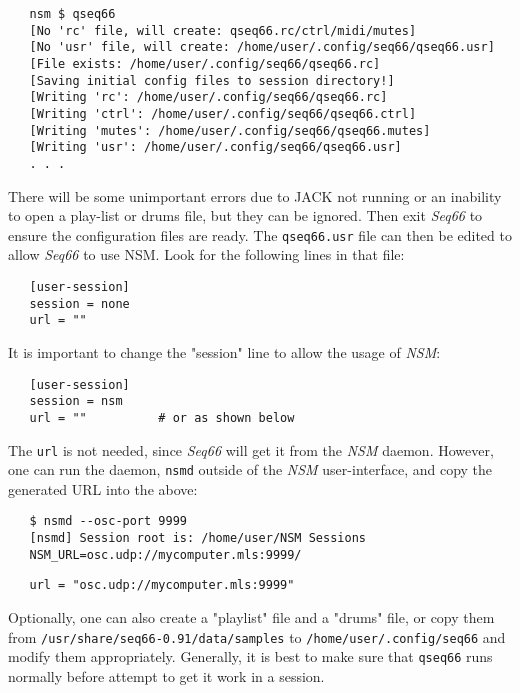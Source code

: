 \begin{verbatim}
   nsm $ qseq66 
   [No 'rc' file, will create: qseq66.rc/ctrl/midi/mutes]
   [No 'usr' file, will create: /home/user/.config/seq66/qseq66.usr]
   [File exists: /home/user/.config/seq66/qseq66.rc]
   [Saving initial config files to session directory!]
   [Writing 'rc': /home/user/.config/seq66/qseq66.rc]
   [Writing 'ctrl': /home/user/.config/seq66/qseq66.ctrl]
   [Writing 'mutes': /home/user/.config/seq66/qseq66.mutes]
   [Writing 'usr': /home/user/.config/seq66/qseq66.usr]
   . . .
\end{verbatim}

   There will be some unimportant errors due to JACK not running or an
   inability to open a play-list or drums file, but they can be ignored.
   Then exit \textsl{Seq66} to ensure the configuration files are ready.
   The \texttt{qseq66.usr} file can then be edited to allow \textsl{Seq66} to
   use NSM.  Look for the following lines in that file:

\begin{verbatim}
   [user-session]
   session = none
   url = ""
\end{verbatim}

   It is important to change the "session" line to allow the usage of
   \textsl{NSM}:

\begin{verbatim}
   [user-session]
   session = nsm
   url = ""          # or as shown below
\end{verbatim}

   The \texttt{url} is not needed, since \textsl{Seq66} will get it
   from the \textsl{NSM} daemon.  However, one can run the daemon,
   \texttt{nsmd} outside of the \textsl{NSM} user-interface, and copy the
   generated URL into the above:

\begin{verbatim}
   $ nsmd --osc-port 9999
   [nsmd] Session root is: /home/user/NSM Sessions
   NSM_URL=osc.udp://mycomputer.mls:9999/
\end{verbatim}

\begin{verbatim}
   url = "osc.udp://mycomputer.mls:9999"
\end{verbatim}

   Optionally, one can also create a "playlist" file and a "drums" file, or
   copy them from \texttt{/usr/share/seq66-0.91/data/samples} to
   \texttt{/home/user/.config/seq66} and modify them appropriately.
   Generally, it is best to make sure that \texttt{qseq66} runs normally before
   attempt to get it work in a session.

